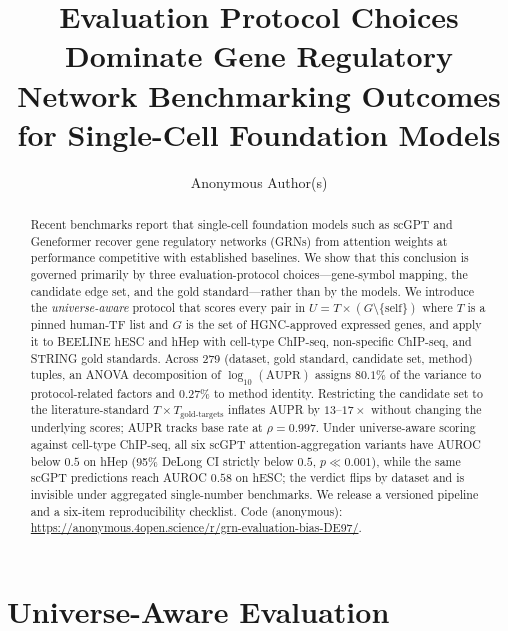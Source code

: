 \documentclass[sigconf, nonacm, anonymous]{acmart}
\begin{document}
\title[Protocol Choices Dominate GRN Benchmarking]{Evaluation Protocol Choices Dominate Gene Regulatory Network Benchmarking Outcomes for Single-Cell Foundation Models}

\author{Anonymous Author(s)}
\renewcommand{\shortauthors}{Anonymous}

\begin{abstract}
Recent benchmarks report that single-cell foundation models such as scGPT
and Geneformer recover gene regulatory networks (GRNs) from attention
weights at performance competitive with established baselines. We show
that this conclusion is governed primarily by three evaluation-protocol
choices---gene-symbol mapping, the candidate edge set, and the gold
standard---rather than by the models. We introduce the
\emph{universe-aware} protocol that scores every pair in
$U = T \times (G \setminus \{\text{self}\})$ where $T$ is a pinned
human-TF list and $G$ is the set of HGNC-approved expressed genes, and
apply it to BEELINE hESC and hHep with cell-type ChIP-seq,
non-specific ChIP-seq, and STRING gold standards. Across 279 (dataset,
gold standard, candidate set, method) tuples, an ANOVA decomposition of
$\log_{10}(\text{AUPR})$ assigns $80.1\%$ of the variance to
protocol-related factors and $0.27\%$ to method identity. Restricting
the candidate set to the literature-standard
$T \times T_{\text{gold-targets}}$ inflates AUPR by $13\text{--}17\times$
without changing the underlying scores; AUPR tracks base rate at
$\rho = 0.997$. Under universe-aware scoring against cell-type ChIP-seq,
all six scGPT attention-aggregation variants have AUROC below $0.5$ on
hHep (95\% DeLong CI strictly below $0.5$, $p \ll 0.001$), while the
same scGPT predictions reach AUROC $0.58$ on hESC; the verdict flips by
dataset and is invisible under aggregated single-number benchmarks. We
release a versioned pipeline and a six-item reproducibility checklist.
Code (anonymous):
\url{https://anonymous.4open.science/r/grn-evaluation-bias-DE97/}.
\end{abstract}


\maketitle

\section{Universe-Aware Evaluation}
\end{document}
